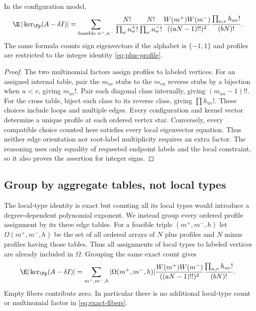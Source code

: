 \begin{lemma}\label{lem:exact-types}
In the configuration model,
\begin{equation}\label{eq:exact-types}
 \E\,|\ker_{\Fp}(A-\delta I)|
 =\sum_{\text{feasible }n^+,n^-}
 \frac{N!}{\prod_\omega n^+_\omega!}
 \frac{N!}{\prod_\omega n^-_\omega!}
 \frac{W(m^+)W(m^-)}{((aN-1)!!)^2}
 \frac{\prod_{u,v}h_{uv}!}{(bN)!}.
\end{equation}
The same formula counts sign eigenvectors if the alphabet is
$\{-1,1\}$ and profiles are restricted to the integer identity
\eqref{eq:plus-profile}.
\end{lemma}
\begin{proof}
The two multinomial factors assign profiles to labeled vertices.
For an assigned internal table, pair the $m_{uv}$ stubs to the
$m_{vu}$ reverse stubs by a bijection when $u<v$, giving $m_{uv}!$.
Pair each diagonal class internally, giving $(m_{uu}-1)!!$.
For the cross table, biject each class to its reverse class, giving
$\prod h_{uv}!$. These choices include loops and multiple edges.
Every configuration and kernel vector determine a unique profile at
each ordered vertex star. Conversely, every compatible choice counted
here satisfies every local eigenvector equation. Thus neither edge
orientation nor root-label multiplicity requires an extra factor.
The reasoning uses only equality of requested endpoint labels and the
local constraint, so it also proves the assertion for integer signs.
\end{proof}

\subsection{Group by aggregate tables, not local types}
The local-type identity is exact but counting all its local types
would introduce a degree-dependent polynomial exponent. We instead
group every ordered profile assignment by its three edge tables.
For a feasible triple $(m^+,m^-,h)$ let $\Omega(m^+,m^-,h)$ be the
set of all ordered arrays of $N$ plus profiles and $N$ minus profiles
having those tables. Thus all assignments of local types to labeled
vertices are already included in $\Omega$. Grouping the same exact
count gives
\begin{equation}\label{eq:exact-fibers}
 \E|\ker_{\Fp}(A-\delta I)|
 =\sum_{m^+,m^-,h}|\Omega(m^+,m^-,h)|
 \frac{W(m^+)W(m^-)}{((aN-1)!!)^2}
 \frac{\prod_{u,v}h_{uv}!}{(bN)!}.
\end{equation}
Empty fibers contribute zero. In particular there is no additional
local-type count or multinomial factor in \eqref{eq:exact-fibers}.

